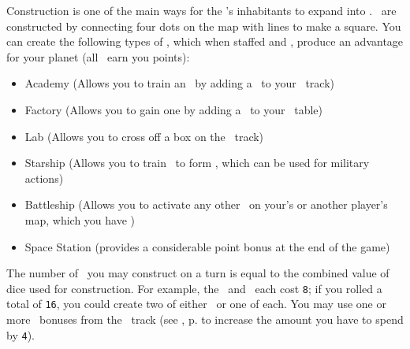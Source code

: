 Construction is one of the main ways for the \planet's inhabitants to expand into \outerspace.
\armaments\ are constructed by connecting four dots on the map with lines to make a square.
\newline\newline
You can create the following types of \armaments, which when staffed and \activated, produce an advantage for your planet (all \armaments\ earn you points):
\begin{itemize}
  \item Academy (Allows you to train an \astronaut\ by adding a \gainastronautsymbol\ to your \population\ track)
  \item Factory (Allows you to gain one \currency by adding a \gaincurrency\ to your \currency\ table)
  \item Lab (Allows you to cross off a box on the \tech\ track)
  \item Starship (Allows you to train \astronauts\ to form \squadrons, which can be used for military actions)
  \item Battleship (Allows you to activate any other \armaments\ on your's or another player's map, which you have \reach)
  \item Space Station (provides a considerable point bonus at the end of the game)
\end{itemize}
The number of \armaments\ you may construct on a turn is equal to the combined value of dice used for construction.  For example, the \academy\ and \factory\ each cost \texttt{8}; if you rolled a total of \texttt{16}, you could create two of either \armaments\ or one of each.  You may use one or more \greatperson\ bonuses from the \population\ track (see , p.\pageref{sec:population} to increase the amount you have to spend by \texttt{4}).
